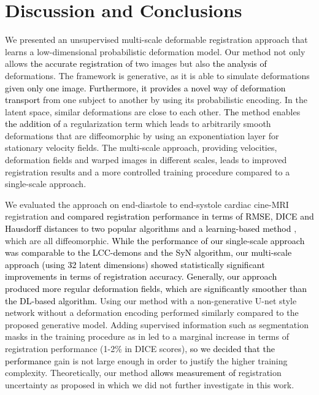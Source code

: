\documentclass[journal]{IEEEtran}
\newcommand{\update}[1]{\textcolor{black}{#1}}
\begin{document}
\section{Discussion and Conclusions}
We presented an unsupervised multi-scale deformable registration approach that learns a low-dimensional probabilistic deformation model. Our method not only allows \update{the accurate registration of} two images but also \update{the analysis of} deformations. The framework is generative, as it is able to simulate deformations \update{given only one image. Furthermore, it provides a novel way of deformation transport} from one subject to another by using its probabilistic encoding. In the latent space, similar deformations are close to each other. \update{The} method enables \update{the addition of} a regularization term which leads to arbitrarily smooth deformations that are diffeomorphic by using an exponentiation layer for stationary velocity fields. The multi-scale approach, providing velocities, deformation fields and warped images in different scales, leads to improved registration results and a more controlled training procedure compared to a single-scale approach. 

We evaluated the approach on end-diastole to end-systole cardiac cine-MRI registration \update{and compared registration performance in terms of RMSE, DICE and Hausdorff distances to two popular algorithms  \cite{lorenzi2013lcc,avants2008symmetric} and a learning-based method \cite{dalca2018unsupervised}}, which are all diffeomorphic. \update{While the performance of our single-scale approach was comparable to the LCC-demons and the SyN algorithm, our multi-scale approach (using 32 latent dimensions) showed statistically significant improvements in terms of registration accuracy. Generally, our approach produced more regular deformation fields, which are significantly smoother than the DL-based algorithm.} Using our method with a non-generative U-net style network \cite{ronneberger2015u} without a deformation encoding performed similarly compared to the proposed generative model. Adding supervised information such as segmentation masks in the training procedure as in \cite{hu2018weakly,fan2018birnet} led to a marginal increase in terms of registration performance (1-2\% in DICE scores), \update{so we decided that the performance} gain is not large enough in order to justify the higher training complexity. Theoretically, our method \update{allows measurement of} registration uncertainty as proposed in \cite{dalca2018unsupervised} which we did not further investigate in this work. 
\end{document}
